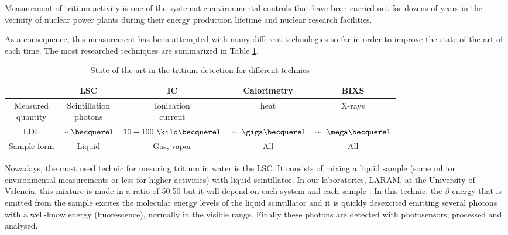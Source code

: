 Measurement of tritium activity is one of the systematic environmental controls that have been carried out for dozens of years in the vecinity of nuclear power plants during their energy production lifetime and nuclear research facilities.

As a consequence, this measurement has been attempted with many different technologies so far in order to improve the state of the art of each time. The most researched techniques are summarized in Table \ref{tab:DifferentThecnics}.

\begin{table}[htbp]
\begin{center}
\begin{tabular}{|c|c|c|c|c|}
\hline
 & LSC & IC & Calorimetry & BIXS\\
\hline \hline \hline
\parbox{5em}{\centering Measured\\ quantity} & \parbox{5em}{\centering Scintillation\\ photons} &  \parbox{5em}{\centering Ionization\\ current} & heat & X-rays\\ \hline
LDL & $\sim\becquerel$ & $10-100~\kilo\becquerel$ & $\sim~\giga\becquerel$ & $\sim~\mega\becquerel$ \\ \hline
Sample form & Liquid & Gas, vapor & All & All \\ \hline
\end{tabular}
\caption{State-of-the-art in the tritium detection for different technics}
\label{tab:DifferentThecnics}
\end{center}
\end{table}

Nowadays, the most used technic for mesuring tritium in water is the LSC. It consists of mixing a liquid sample (some ml for environmental measurements or less for higher activities) with liquid scintillator. In our laboratories, LARAM, at the University of Valencia, this mixture is made in a ratio of 50:50 \cite{LSCLARAM} but it will depend on each system and each sample \cite{LSCothers, HofstetterSeveral}. In this technic, the $\beta$ energy that is emitted from the sample excites the molecular energy levels of the liquid scintillator and it is quickly desexcited emitting several photons with a well-know energy (fluorescence), normally in the visible range. Finally these photons are detected with photosensors, processed and analysed.

